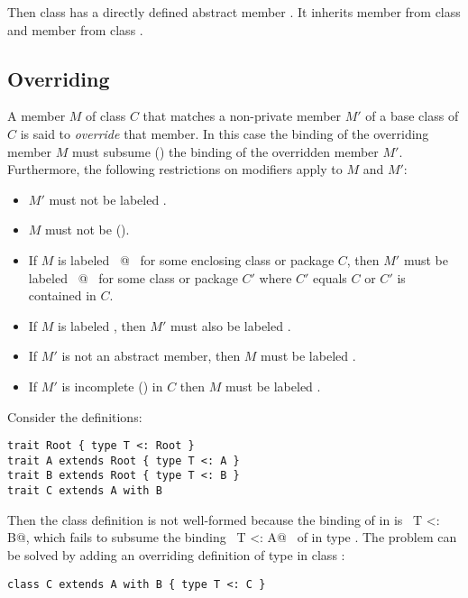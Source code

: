 Then class  has a directly defined abstract member . It
inherits member  from class  and member  from
class .

\subsection{Overriding}
\label{sec:overriding}


A member $M$ of class $C$ that matches a non-private member $M'$ of a
base class of $C$ is said to {\em override} that member.  In this case
the binding of the overriding member $M$ must subsume
() the binding of the overridden member $M'$.
Furthermore, the following restrictions on modifiers apply to $M$ and
$M'$:
\begin{itemize}
\item
$M'$ must not be labeled .
\item
$M$ must not be  ().
\item
If $M$ is labeled ~\lstinline@private[$C$]@~ for some enclosing class or package $C$,
then $M'$ must be labeled ~\lstinline@private[$C'$]@~ for some class or package $C'$ where
$C'$ equals $C$ or $C'$ is contained in $C$.
\item
If $M$ is labeled , then $M'$ must also be
labeled .
\item
If $M'$ is not an abstract member, then
$M$ must be labeled .
\item
If $M'$ is incomplete () in $C$ then $M$ must be
labeled .
\end{itemize}

\example\label{ex:compound-a}
Consider the definitions:
\begin{lstlisting}
trait Root { type T <: Root }
trait A extends Root { type T <: A }
trait B extends Root { type T <: B }
trait C extends A with B 
\end{lstlisting}
Then the class definition  is not well-formed because the
binding of  in  is
~\lstinline@type T <: B@,
which fails to subsume the binding ~\lstinline@type T <: A@~ of 
in type . The problem can be solved by adding an overriding 
definition of type  in class :
\begin{lstlisting}
class C extends A with B { type T <: C }
\end{lstlisting}

